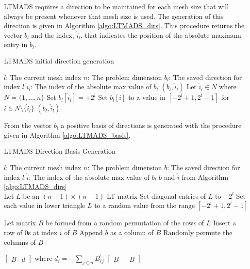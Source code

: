 \ac{LTMADS} requires a direction to be maintained for each mesh size that will always be present whenever that mesh size is used. The generation of this direction is given in Algorithm \ref{algo:LTMADS_dirs}. This procedure returns the vector $b_l$ and the index, $\hat{i}_l$, that indicates the position of the absolute maximum entry in $b_l$. 

\begin{algorithm}
\caption{LTMADS initial direction generation}
\label{algo:LTMADS_dirs}
\begin{algorithmic}
\STATE $l$: The current mesh index
\STATE $n$: The problem dimension
\STATE $b_l$: The saved direction for index $l$
\STATE $\hat{i}_l$: The index of the absolute max value of $b_l$
    \RETURN $(b_l, \hat{i}_l)$
\ELSE
    \STATE Let $\hat{i}_l \in N$ where $N = \{1,\ldots,n\}$
    \STATE Set $b_l[\hat{i}_l]=\pm2^l$
    \STATE Set $b_l[i]$ to a value in $[-2^l+1,2^l-1]$ for $i\in N\setminus \{\hat{i}_l\}$
    \RETURN $(b_l, \hat{i}_l)$
\ENDIF
\end{algorithmic}
\end{algorithm}

From the vector $b_l$ a positive basis of directions is generated with the procedure given in Algorithm \ref{algo:LTMADS_basis}.

\begin{algorithm}
\caption{LTMADS Direction Basis Generation}
\label{algo:LTMADS_basis}
\begin{algorithmic}
\STATE $l$: The current mesh index
\STATE $n$: The problem dimension
\STATE $b$: The saved direction for index $l$
\STATE $\hat{i}$: The index of the absolute max value of $b_l$
\REQUIRE $b$ and $\hat{i}$ from Algorithm \ref{algo:LTMADS_dirs}\\
    \STATE Let $L$ be an $(n-1)\times(n-1)$ LT matrix 
    \STATE Set diagonal entries of $L$ to $\pm2^l$
    \STATE Set each value in lower triangle $L$ to a random value from the range $[-2^l+1,2^l-1]$
    
    \STATE Let matrix $B$ be formed from a random permutation of the rows of $L$
    \STATE Insert a row of $0$s at index $\hat{i}$ of $B$
    \STATE Append $b$ as a column of $B$
    \STATE Randomly permute the columns of $B$    
    
        \RETURN $\begin{bmatrix}B & d\end{bmatrix}$ where  $d_i = -\sum_{j\in n}B^\prime_{ij}$
        \RETURN $\begin{bmatrix}B & -B\end{bmatrix}$
    \ENDIF
\end{algorithmic}
\end{algorithm}

